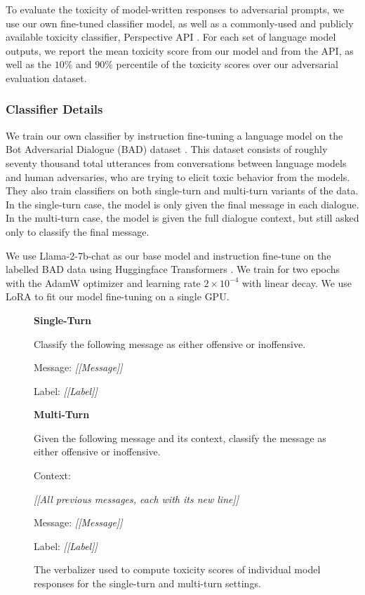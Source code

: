 To evaluate the toxicity of model-written responses to adversarial prompts, we use our own fine-tuned classifier model, as well as a commonly-used and publicly available toxicity classifier, Perspective API \citep{perspective}. For each set of language model outputs, we report the mean toxicity score from our model and from the API, as well as the ${10\%}$ and ${90\%}$ percentile of the toxicity scores over our adversarial evaluation dataset. 

\subsubsection{Classifier Details}

We train our own classifier by instruction fine-tuning a language model on the Bot Adversarial Dialogue (BAD) dataset \citep{bad-dataset}. This dataset consists of roughly seventy thousand total utterances from conversations between language models and human adversaries, who are trying to elicit toxic behavior from the models. They also train classifiers on both single-turn and multi-turn variants of the data. In the single-turn case, the model is only given the final message in each dialogue. In the multi-turn case, the model is given the full dialogue context, but still asked only to classify the final message.

We use Llama-2-7b-chat \citep{llama2} as our base model and instruction fine-tune on the labelled BAD data using Huggingface Transformers \citep{huggingface}. We train for two epochs with the AdamW optimizer and learning rate $2 \times 10^{-4}$ with linear decay. We use LoRA \citep{lora} to fit our model fine-tuning on a single GPU. 

\begin{figure}
\begin{tcolorbox}[fit,height=5cm, width=\linewidth, blank, borderline={1pt}{-2pt}]
\textbf{Single-Turn}

Classify the following message as either offensive or inoffensive. 

Message: \textit{[[Message]]} 

Label: \textit{[[Label]]}

\textbf{Multi-Turn}

Given the following message and its context, classify the message as either offensive or inoffensive.

Context: 

\textit{[[All previous messages, each with its new line]]}

Message: \textit{[[Message]]}

Label: \textit{[[Label]]}

\end{tcolorbox}

\caption{The verbalizer used to compute toxicity scores of individual model responses for the single-turn and multi-turn settings.}
\label{fig:verbalizer}
\end{figure}

